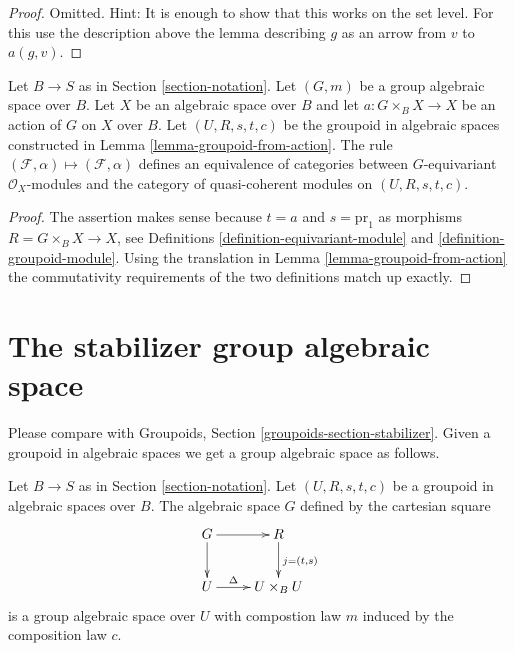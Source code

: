 \begin{proof}
Omitted. Hint: It is enough to show that this works on the set
level. For this use the description above the lemma describing
$g$ as an arrow from $v$ to $a(g, v)$.
\end{proof}

\begin{lemma}
\label{lemma-action-groupoid-modules}
Let $B \to S$ as in Section \ref{section-notation}.
Let $(G, m)$ be a group algebraic space over $B$.
Let $X$ be an algebraic space over $B$ and let $a : G \times_B X \to X$
be an action of $G$ on $X$ over $B$. Let $(U, R, s, t, c)$ be
the groupoid in algebraic spaces constructed in
Lemma \ref{lemma-groupoid-from-action}.
The rule
$(\mathcal{F}, \alpha) \mapsto (\mathcal{F}, \alpha)$ defines
an equivalence of categories between $G$-equivariant
$\mathcal{O}_X$-modules and the category of quasi-coherent
modules on $(U, R, s, t, c)$.
\end{lemma}

\begin{proof}
The assertion makes sense because $t = a$ and $s = \text{pr}_1$
as morphisms $R = G \times_B X \to X$, see
Definitions \ref{definition-equivariant-module} and
\ref{definition-groupoid-module}.
Using the translation in Lemma \ref{lemma-groupoid-from-action}
the commutativity requirements
of the two definitions match up exactly.
\end{proof}





\section{The stabilizer group algebraic space}
\label{section-stabilizer}

\noindent
Please compare with
Groupoids, Section \ref{groupoids-section-stabilizer}.
Given a groupoid in algebraic spaces we get a group algebraic space as follows.

\begin{lemma}
\label{lemma-groupoid-stabilizer}
Let $B \to S$ as in Section \ref{section-notation}.
Let $(U, R, s, t, c)$ be a groupoid in algebraic spaces over $B$.
The algebraic space $G$ defined by the cartesian square
$$
\xymatrix{
G \ar[r] \ar[d] & R \ar[d]^{j = (t, s)} \\
U \ar[r]^-{\Delta} & U \times_B U
}
$$
is a group algebraic space over $U$ with compostion law
$m$ induced by the composition law $c$.
\end{lemma}

